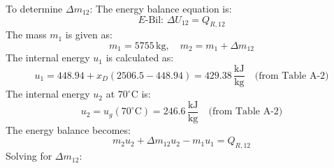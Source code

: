 To determine \( \Delta m_{12} \):  
The energy balance equation is:  
\[
E\text{-Bil: } \Delta U_{12} = Q_{R,12}
\]  
The mass \( m_1 \) is given as:  
\[
m_1 = 5755 \, \text{kg}, \quad m_2 = m_1 + \Delta m_{12}
\]  
The internal energy \( u_1 \) is calculated as:  
\[
u_1 = 448.94 + x_D (2506.5 - 448.94) = 429.38 \, \frac{\text{kJ}}{\text{kg}} \quad \text{(from Table A-2)}
\]  
The internal energy \( u_2 \) at \( 70^\circ\text{C} \) is:  
\[
u_2 = u_g(70^\circ\text{C}) = 246.6 \, \frac{\text{kJ}}{\text{kg}} \quad \text{(from Table A-2)}
\]  
The energy balance becomes:  
\[
m_2 u_2 + \Delta m_{12} u_2 - m_1 u_1 = Q_{R,12}
\]  
Solving for \( \Delta m_{12} \):